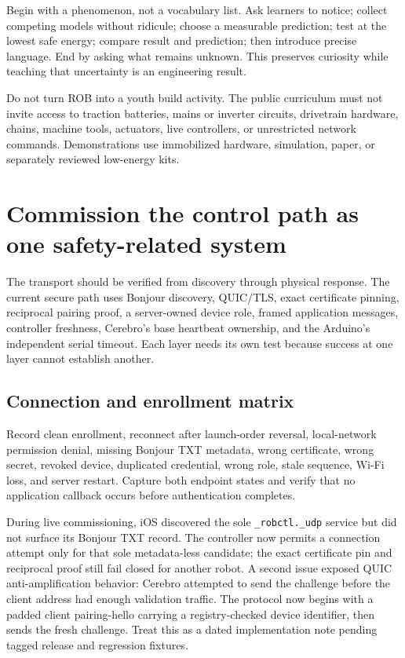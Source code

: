 Begin with a phenomenon, not a vocabulary list. Ask learners to notice; collect competing models without ridicule; choose a measurable prediction; test at the lowest safe energy; compare result and prediction; then introduce precise language. End by asking what remains unknown. This preserves curiosity while teaching that uncertainty is an engineering result.

\begin{safetybox}
Do not turn ROB into a youth build activity. The public curriculum must not invite access to traction batteries, mains or inverter circuits, drivetrain hardware, chains, machine tools, actuators, live controllers, or unrestricted network commands. Demonstrations use immobilized hardware, simulation, paper, or separately reviewed low-energy kits.
\end{safetybox}

\chapter{Commission the control path as one safety-related system}

The transport should be verified from discovery through physical response. The current secure path uses Bonjour discovery, QUIC/TLS, exact certificate pinning, reciprocal pairing proof, a server-owned device role, framed application messages, controller freshness, Cerebro's base heartbeat ownership, and the Arduino's independent serial timeout. Each layer needs its own test because success at one layer cannot establish another.

\section{Connection and enrollment matrix}

Record clean enrollment, reconnect after launch-order reversal, local-network permission denial, missing Bonjour TXT metadata, wrong certificate, wrong secret, revoked device, duplicated credential, wrong role, stale sequence, Wi-Fi loss, and server restart. Capture both endpoint states and verify that no application callback occurs before authentication completes.

\begin{fieldnotebox}[title={2026-08-10 TRANSPORT LESSON}]
During live commissioning, iOS discovered the sole \texttt{\_robctl.\_udp} service but did not surface its Bonjour TXT record. The controller now permits a connection attempt only for that sole metadata-less candidate; the exact certificate pin and reciprocal proof still fail closed for another robot. A second issue exposed QUIC anti-amplification behavior: Cerebro attempted to send the challenge before the client address had enough validation traffic. The protocol now begins with a padded client pairing-hello carrying a registry-checked device identifier, then sends the fresh challenge. Treat this as a dated implementation note pending tagged release and regression fixtures.
\end{fieldnotebox}

